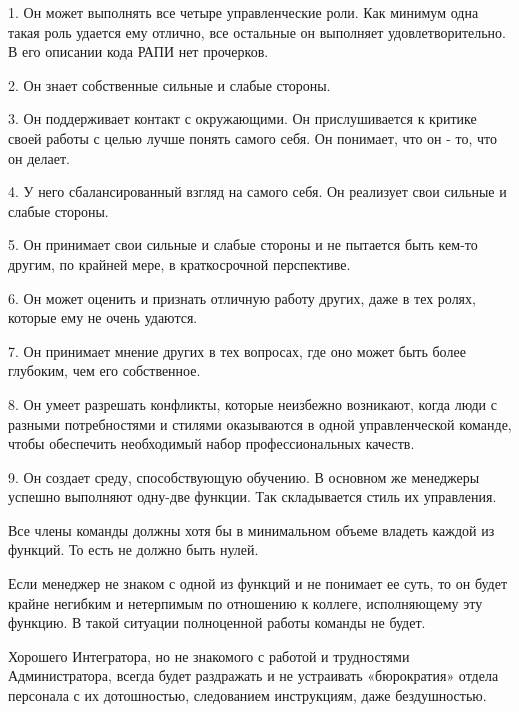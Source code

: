 \documentclass{../industrial-development}
\begin{document}
{1. Он может выполнять все четыре управленческие роли. Как минимум одна такая роль удается ему отлично, все остальные он выполняет удовлетворительно. В его описании кода РАПИ нет прочерков.

2. Он знает собственные сильные и слабые стороны.

3. Он поддерживает контакт с окружающими. Он прислушивается к критике своей работы с целью лучше понять самого себя. Он понимает, что он - то, что он делает.

4. У него сбалансированный взгляд на самого себя. Он реализует свои сильные и слабые стороны.

5. Он принимает свои сильные и слабые стороны и не пытается быть кем-то другим, по крайней мере, в краткосрочной перспективе.

6. Он может оценить и признать отличную работу других, даже в тех ролях, которые ему не очень удаются.

7. Он принимает мнение других в тех вопросах, где оно может быть более глубоким, чем его собственное.

8. Он умеет разрешать конфликты, которые неизбежно возникают, когда люди с разными потребностями и стилями оказываются в одной управленческой команде, чтобы обеспечить необходимый набор профессиональных качеств.

9. Он создает среду, способствующую обучению.
В основном же менеджеры успешно выполняют одну-две функции. Так складывается стиль их управления.

Все члены команды должны хотя бы в минимальном объеме владеть каждой из функций. То есть не должно быть нулей.

Если менеджер не знаком с одной из функций и не понимает ее суть, то он будет крайне негибким и нетерпимым по отношению к коллеге, исполняющему эту функцию. В такой ситуации полноценной работы команды не будет.

Хорошего Интегратора, но не знакомого с работой и трудностями Администратора, всегда будет раздражать и не устраивать «бюрократия» отдела персонала с их дотошностью, следованием инструкциям, даже бездушностью.

}
\end{document}
